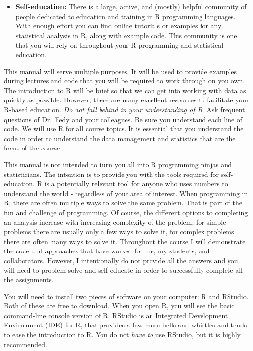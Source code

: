 \documentclass[
]{book}
\begin{document}
\begin{itemize}
\item
  \textbf{Self-education:} There is a large, active, and (mostly) helpful community of people dedicated to education and training in R programming languages. With enough effort you can find online tutorials or examples for any statistical analysis in R, along with example code. This community is one that you will rely on throughout your R programming and statistical education.
\end{itemize}

This manual will serve multiple purposes. It will be used to provide examples during lectures and code that you will be required to work through on you own. The introduction to R will be brief so that we can get into working with data as quickly as possible. However, there are many excellent resources to facilitate your R-based education. \emph{Do not fall behind in your understanding of R}. Ask frequent questions of Dr.~Fedy and your colleagues. Be sure you understand each line of code. We will use R for all course topics. It is essential that you understand the code in order to understand the data management and statistics that are the focus of the course.

This manual is not intended to turn you all into R programming ninjas and statisticians. The intention is to provide you with the tools required for self-education. R is a potentially relevant tool for anyone who uses numbers to understand the world - regardless of your area of interest. When programming in R, there are often multiple ways to solve the same problem. That is part of the fun and challenge of programming. Of course, the different options to completing an analysis increase with increasing complexity of the problem; for simple problems there are usually only a few ways to solve it, for complex problems there are often many ways to solve it. Throughout the course I will demonstrate the code and approaches that have worked for me, my students, and collaborators. However, I intentionally do not provide all the answers and you will need to problem-solve and self-educate in order to successfully complete all the assignments.

You will need to install two pieces of software on your computer: \href{https://www.r-project.org/}{R} and \href{https://www.r-project.org/}{RStudio}. Both of these are free to download. When you open R, you will see the basic command-line console version of R. RStudio is an Integrated Development Environment (IDE) for R, that provides a few more bells and whistles and tends to ease the introduction to R. You do not \emph{have to} use RStudio, but it is highly recommended.
\end{document}
